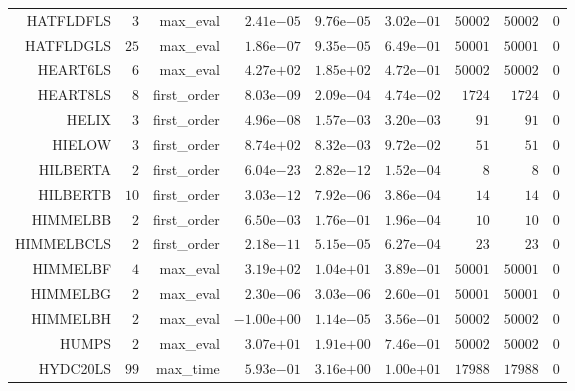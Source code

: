 \begin{longtable}{rrrrrrrrr}
HATFLDFLS & \(     3\) & max\_eval & \( 2.41\)e\(-05\) & \( 9.76\)e\(-05\) & \( 3.02\)e\(-01\) & \( 50002\) & \( 50002\) & \(     0\) \\
HATFLDGLS & \(    25\) & max\_eval & \( 1.86\)e\(-07\) & \( 9.35\)e\(-05\) & \( 6.49\)e\(-01\) & \( 50001\) & \( 50001\) & \(     0\) \\
HEART6LS & \(     6\) & max\_eval & \( 4.27\)e\(+02\) & \( 1.85\)e\(+02\) & \( 4.72\)e\(-01\) & \( 50002\) & \( 50002\) & \(     0\) \\
HEART8LS & \(     8\) & first\_order & \( 8.03\)e\(-09\) & \( 2.09\)e\(-04\) & \( 4.74\)e\(-02\) & \(  1724\) & \(  1724\) & \(     0\) \\
HELIX & \(     3\) & first\_order & \( 4.96\)e\(-08\) & \( 1.57\)e\(-03\) & \( 3.20\)e\(-03\) & \(    91\) & \(    91\) & \(     0\) \\
HIELOW & \(     3\) & first\_order & \( 8.74\)e\(+02\) & \( 8.32\)e\(-03\) & \( 9.72\)e\(-02\) & \(    51\) & \(    51\) & \(     0\) \\
HILBERTA & \(     2\) & first\_order & \( 6.04\)e\(-23\) & \( 2.82\)e\(-12\) & \( 1.52\)e\(-04\) & \(     8\) & \(     8\) & \(     0\) \\
HILBERTB & \(    10\) & first\_order & \( 3.03\)e\(-12\) & \( 7.92\)e\(-06\) & \( 3.86\)e\(-04\) & \(    14\) & \(    14\) & \(     0\) \\
HIMMELBB & \(     2\) & first\_order & \( 6.50\)e\(-03\) & \( 1.76\)e\(-01\) & \( 1.96\)e\(-04\) & \(    10\) & \(    10\) & \(     0\) \\
HIMMELBCLS & \(     2\) & first\_order & \( 2.18\)e\(-11\) & \( 5.15\)e\(-05\) & \( 6.27\)e\(-04\) & \(    23\) & \(    23\) & \(     0\) \\
HIMMELBF & \(     4\) & max\_eval & \( 3.19\)e\(+02\) & \( 1.04\)e\(+01\) & \( 3.89\)e\(-01\) & \( 50001\) & \( 50001\) & \(     0\) \\
HIMMELBG & \(     2\) & max\_eval & \( 2.30\)e\(-06\) & \( 3.03\)e\(-06\) & \( 2.60\)e\(-01\) & \( 50001\) & \( 50001\) & \(     0\) \\
HIMMELBH & \(     2\) & max\_eval & \(-1.00\)e\(+00\) & \( 1.14\)e\(-05\) & \( 3.56\)e\(-01\) & \( 50002\) & \( 50002\) & \(     0\) \\
HUMPS & \(     2\) & max\_eval & \( 3.07\)e\(+01\) & \( 1.91\)e\(+00\) & \( 7.46\)e\(-01\) & \( 50002\) & \( 50002\) & \(     0\) \\
HYDC20LS & \(    99\) & max\_time & \( 5.93\)e\(-01\) & \( 3.16\)e\(+00\) & \( 1.00\)e\(+01\) & \( 17988\) & \( 17988\) & \(     0\) \\

\end{longtable}
